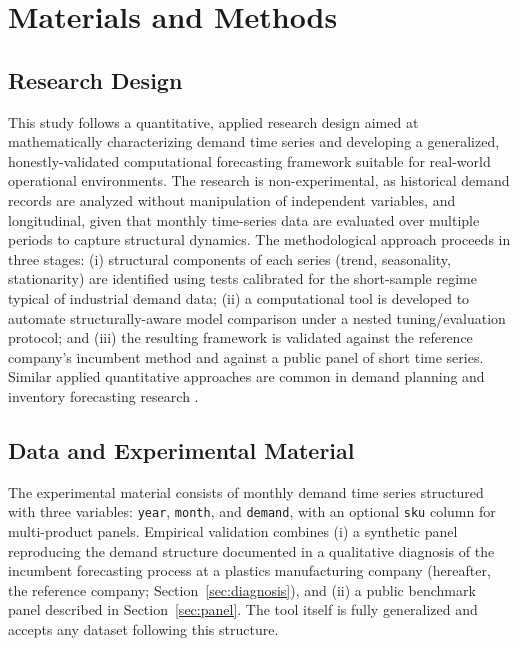 \documentclass[forecasting,article,submit,pdftex,moreauthors]{Definitions/mdpi}
\begin{document}
\section{Materials and Methods}
\label{sec:methods}

\subsection{Research Design}

This study follows a quantitative, applied research design aimed at mathematically characterizing demand time series and developing a generalized, honestly-validated computational forecasting framework suitable for real-world operational environments. The research is non-experimental, as historical demand records are analyzed without manipulation of independent variables, and longitudinal, given that monthly time-series data are evaluated over multiple periods to capture structural dynamics. The methodological approach proceeds in three stages: (i) structural components of each series (trend, seasonality, stationarity) are identified using tests calibrated for the short-sample regime typical of industrial demand data; (ii) a computational tool is developed to automate structurally-aware model comparison under a nested tuning/evaluation protocol; and (iii) the resulting framework is validated against the reference company's incumbent method and against a public panel of short time series. Similar applied quantitative approaches are common in demand planning and inventory forecasting research \cite{petropoulos2022}.

\subsection{Data and Experimental Material}
\label{sec:data}

The experimental material consists of monthly demand time series structured with three variables: \texttt{year}, \texttt{month}, and \texttt{demand}, with an optional \texttt{sku} column for multi-product panels. Empirical validation combines (i) a synthetic panel reproducing the demand structure documented in a qualitative diagnosis of the incumbent forecasting process at a plastics manufacturing company (hereafter, the reference company; Section~\ref{sec:diagnosis}), and (ii) a public benchmark panel described in Section~\ref{sec:panel}. The tool itself is fully generalized and accepts any dataset following this structure.
\end{document}
